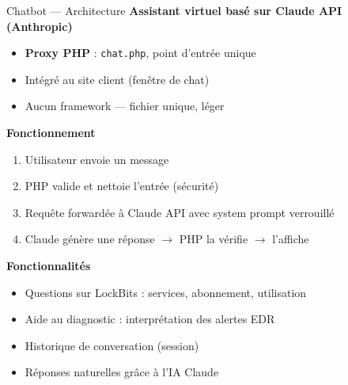 \documentclass[xcolor=dvipsnames, aspectratio=169, 10pt]{beamer}
\newcommand{\bitem}{\item[$\bullet$]}
\begin{document}
\begin{frame}{Chatbot — Architecture}
  \textbf{Assistant virtuel basé sur Claude API (Anthropic)}
  \begin{itemize}
    \bitem \textbf{Proxy PHP} : \texttt{chat.php}, point d'entrée unique
    \bitem Intégré au site client (fenêtre de chat)
    \bitem Aucun framework — fichier unique, léger
  \end{itemize}
  \vspace{0.3cm}
  \textbf{Fonctionnement}
  \begin{enumerate}
    \item Utilisateur envoie un message
    \item PHP valide et nettoie l'entrée (sécurité)
    \item Requête forwardée à Claude API avec system prompt verrouillé
    \item Claude génère une réponse $\rightarrow$ PHP la vérifie $\rightarrow$ l'affiche
  \end{enumerate}
  \vspace{0.3cm}
  \textbf{Fonctionnalités}
  \begin{itemize}
    \bitem Questions sur LockBits : services, abonnement, utilisation
    \bitem Aide au diagnostic : interprétation des alertes EDR
    \bitem Historique de conversation (session)
    \bitem Réponses naturelles grâce à l'IA Claude
  \end{itemize}
\end{frame}
\end{document}

